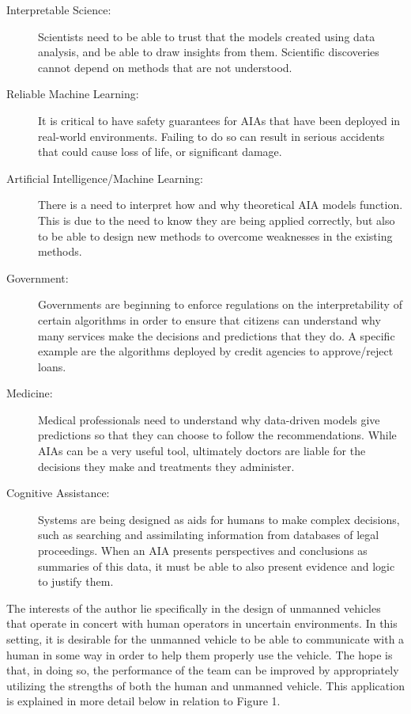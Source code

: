 %
    \begin{description}
        \item [Interpretable Science:] Scientists need to be able to trust that the models created using data analysis, and be able to draw insights from them. Scientific discoveries cannot depend on methods that are not understood.
        \item [Reliable Machine Learning:] It is critical to have safety guarantees for AIAs that have been deployed in real-world environments. Failing to do so can result in serious accidents that could cause loss of life, or significant damage.
        \item [Artificial Intelligence/Machine Learning:] There is a need to interpret how and why theoretical AIA models function. This is due to the need to know they are being applied correctly, but also to be able to design new methods to overcome weaknesses in the existing methods.
        \item [Government:] Governments are beginning to enforce regulations on the interpretability of certain algorithms in order to ensure that citizens can understand why many services make the decisions and predictions that they do. A specific example are the algorithms deployed by credit agencies to approve/reject loans.
        \item [Medicine:] Medical professionals need to understand why data-driven models give predictions so that they can choose to follow the recommendations. While AIAs can be a very useful tool, ultimately doctors are liable for the decisions they make and treatments they administer.
        \item [Cognitive Assistance:] Systems are being designed as aids for humans to make complex decisions, such as searching and assimilating information from databases of legal proceedings. When an AIA presents perspectives and conclusions as summaries of this data, it must be able to also present evidence and logic to justify them.
    \end{description}

    The interests of the author lie specifically in the design of unmanned vehicles that operate in concert with human operators in uncertain environments. In this setting, it is desirable for the unmanned vehicle to be able to communicate with a human in some way in order to help them properly use the vehicle. The hope is that, in doing so, the performance of the team can be improved by appropriately utilizing the strengths of both the human and unmanned vehicle. This application is explained in more detail below in relation to Figure 1.

